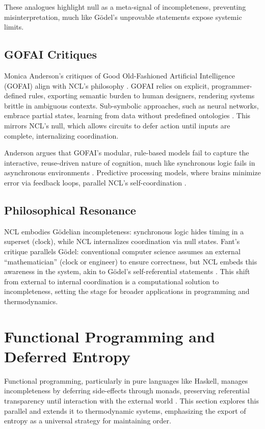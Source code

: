 \documentclass{article}
\begin{document}
These analogues highlight null as a meta-signal of incompleteness, preventing misinterpretation, much like G\"{o}del's unprovable statements expose systemic limits.

\subsection{GOFAI Critiques}
Monica Anderson's critiques of Good Old-Fashioned Artificial Intelligence (GOFAI) align with NCL's philosophy \citep{anderson2006}. GOFAI relies on explicit, programmer-defined rules, exporting semantic burden to human designers, rendering systems brittle in ambiguous contexts. Sub-symbolic approaches, such as neural networks, embrace partial states, learning from data without predefined ontologies \citep{clark2013, hohwy2013}. This mirrors NCL's null, which allows circuits to defer action until inputs are complete, internalizing coordination.

Anderson argues that GOFAI's modular, rule-based models fail to capture the interactive, reuse-driven nature of cognition, much like synchronous logic fails in asynchronous environments \citep{anderson2006}. Predictive processing models, where brains minimize error via feedback loops, parallel NCL's self-coordination \citep{clark2013, hohwy2013}.

\subsection{Philosophical Resonance}
NCL embodies G\"{o}delian incompleteness: synchronous logic hides timing in a superset (clock), while NCL internalizes coordination via null states. Fant's critique parallels G\"{o}del: conventional computer science assumes an external ``mathematician'' (clock or engineer) to ensure correctness, but NCL embeds this awareness in the system, akin to G\"{o}del's self-referential statements \citep{fant2005, nagel1958}. This shift from external to internal coordination is a computational solution to incompleteness, setting the stage for broader applications in programming and thermodynamics.

\section{Functional Programming and Deferred Entropy}
\label{sec:programming_entropy}
Functional programming, particularly in pure languages like Haskell, manages incompleteness by deferring side-effects through monads, preserving referential transparency until interaction with the external world \citep{wadler1992, turner1979}. This section explores this parallel and extends it to thermodynamic systems, emphasizing the export of entropy as a universal strategy for maintaining order.
\end{document}
